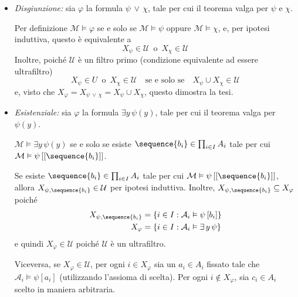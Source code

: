 {\begin{itemize}
\begin{itemize}
            Ma $ X_{\psi}\notin\mathcal{U}  $ se e solo se $ X_{\varphi} \in \mathcal{U}  $, poiché $ X_{\varphi}=I\setminus X_{\psi} $ e $ \mathcal{U} $ è ultrafiltro.
            \item \emph{Disgiunzione:} sia $ \varphi $ la formula $ \psi \,\lor\, \chi $, tale per cui il teorema valga per $ \psi $ e $ \chi $. 
            
            Per definizione $ \mathcal{M}\vDash \varphi $ se e solo se $ \mathcal{M}\vDash \psi $ oppure $ \mathcal{M}\vDash \chi $, e, per ipotesi induttiva, questo è equivalente a 
            \[
                X_{\psi} \in \mathcal{U}\,\text{ o }\,X_{\chi} \in \mathcal{U}  
            \]Inoltre, poiché $ \mathcal{U} $ è un filtro primo (condizione equivalente ad essere ultrafiltro) \[
                X_{\psi} \in U\,\text{ o }\,X_{\chi} \in \mathcal{U} \quad\text{se e solo se}\quad X_{\psi}\cup X_{\chi} \in \mathcal{U}   
            \]e, visto che $ X_{\varphi} = X_{\psi \,\lor\,\chi} = X_{\psi}\cup X_{\chi}     $, questo dimostra la tesi.
            \item \emph{Esistenziale:} sia $ \varphi $ la formula $ \exists y \, \psi(y) $, tale per cui il teorema valga per $ \psi(y) $. 
            
            $ \mathcal{M}\vDash \exists y \, \psi(y)$ se e solo se esiste $ \sequence{b_{i} } \in \prod_{i \in I} A_{i} $ tale per cui $ \mathcal{M}\vDash \psi\left[\left[\sequence{b_{i} }\right]\right] $. 
            
            Se esiste $\sequence{b_{i} } \in \prod_{i \in I} A_{i} $ tale per cui $ \mathcal{M}\vDash \psi\left[\left[\sequence{b_{i} }\right]\right]$, allora $ X_{\psi, \sequence{b_{i}}} \in \mathcal{U} $ per ipotesi induttiva. Inoltre, $ X_{\psi, \sequence{b_{i} }} \subseteq X_{\varphi} $ poiché \begin{align*}
                X_{\psi,\sequence{b_i}} &= \{ i \in I: \mathcal{A}_i\vDash \psi\left[b_{i} \right]\}\\ 
                X_{\varphi} &= \{i \in I: \mathcal{A}_i\vDash \exists\, y\,\psi\} 
            \end{align*}e quindi $ X_{\varphi} \in \mathcal{U}$ poiché $ \mathcal{U} $ è un ultrafiltro.
            
            Viceversa, se $ X_{\varphi} \in \mathcal{U}$, per ogni $ i \in  X_{\varphi}  $ sia un $ a_{i} \in A_{i}$ fissato tale che $ \mathcal{A}_i \vDash \psi[a_{i} ]$ (utilizzando l'assioma di scelta). Per ogni $ i \notin X_{\varphi}  $, sia $ c_{i} \in A_{i}$ scelto in maniera arbitraria. 


\end{itemize}
\end{itemize}}
